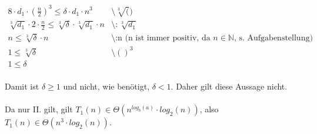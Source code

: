 \documentclass{article}
\begin{document}
\begin{enumerate}
\[\begin{array}{lll}
   	            8 \cdot d_1\cdot (\frac{n}{2})^3 \leq \delta \cdot d_1\cdot n^3 &\text{\textbackslash $\sqrt[3]()$}\\
   	            \sqrt[3]{d_1}\cdot 2 \cdot \frac{n}{2} \leq \sqrt[3]{\delta}\cdot \sqrt[3]{d_1} \cdot n & \text{\textbackslash $:\sqrt[3]{d_1}$}\\
   	            n \leq \sqrt[3]{\delta} \cdot n &\text{\textbackslash :n    (n ist immer positiv, da $n \in \mathbb{N}$, s. Aufgabenstellung)}\\
   	            1 \leq \sqrt[3]{\delta} &\text{\textbackslash $()^3$}\\
   	            1 \leq \delta
   	        \end{array}
   	    \]
   	    \\
   	    Damit ist $\delta \geq 1$ und nicht, wie benötigt, $\delta < 1$. Daher gilt diese Aussage nicht.
   	    \\\\
   	    Da nur II. gilt, gilt $T_1(n) \in \Theta (n^{log_b(a)} \cdot log_2(n))$, also $T_1(n) \in \Theta (n^3 \cdot log_2(n))$.
   	\end{enumerate}
   	
\end{document}

